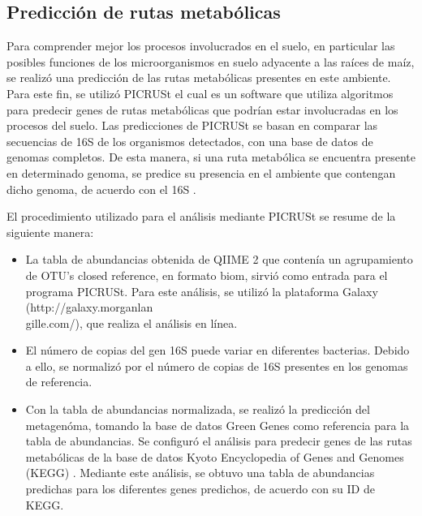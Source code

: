 \documentclass[12pt,letterpaper,oneside]{report}
\begin{document}
\subsection{Predicción de rutas metabólicas}
Para comprender mejor los procesos involucrados en el suelo, en particular las posibles funciones de los microorganismos en suelo adyacente a las raíces de maíz, se realizó una predicción de las rutas metabólicas presentes en este ambiente. Para este fin, se utilizó PICRUSt el cual es un software que utiliza algoritmos para predecir genes de rutas metabólicas que podrían estar involucradas en los procesos del suelo. Las predicciones de PICRUSt se basan en comparar las secuencias de 16S de los organismos detectados, con una base de datos de genomas completos. De esta manera, si una ruta metabólica se encuentra presente en determinado genoma, se predice su presencia en el ambiente que contengan dicho genoma, de acuerdo con el 16S \autocite{Langille2013}. 
\par
El procedimiento utilizado para el análisis mediante PICRUSt se resume de la siguiente manera:
\begin{itemize}
\item La tabla de abundancias obtenida de QIIME 2 que contenía un agrupamiento de OTU's closed reference, en formato biom, sirvió como entrada para el programa PICRUSt. Para este análisis, se utilizó la plataforma Galaxy (http://galaxy.morganlan\\gille.com/), que realiza el análisis en línea.
\item El número de copias del gen 16S puede variar en diferentes bacterias. Debido a ello, se normalizó por el número de copias de 16S presentes en los genomas de referencia.
\item Con la tabla de abundancias normalizada, se realizó la predicción del metagenóma, tomando la base de datos Green Genes \autocite{DeSantis2006} como referencia para la tabla de abundancias. Se configuró el análisis para predecir genes de las rutas metabólicas de la base de datos Kyoto Encyclopedia of Genes and Genomes (KEGG) \autocite{Kanehisa2000}. Mediante este análisis, se obtuvo una tabla de abundancias predichas para los diferentes genes predichos, de acuerdo con su ID de KEGG.
\end{itemize}
\end{document}
